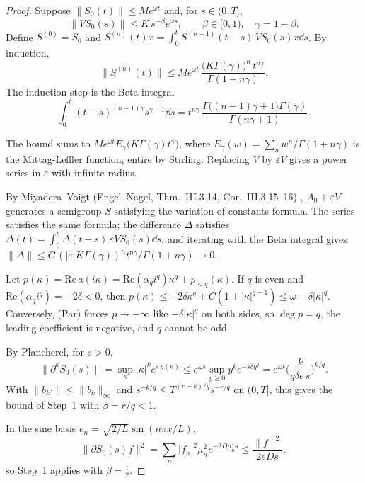 \begin{proof}
Suppose $\|S_0(t)\|\le Me^{\omega t}$ and, for $s\in(0,T]$,
\[
\|VS_0(s)\|\le K\,s^{-\beta}e^{\omega s},\qquad \beta\in[0,1),\quad \gamma=1-\beta .
\]
Define $S^{(0)}=S_0$ and $S^{(n)}(t)x=\int_0^tS^{(n-1)}(t-s)\,VS_0(s)x\dd s$. By induction,
\[
\|S^{(n)}(t)\|\le Me^{\omega t}\,\frac{\big(K\Gamma(\gamma)\big)^n\,t^{n\gamma}}{\Gamma(1+n\gamma)} .
\]
The induction step is the Beta integral
\[
\int_0^t(t-s)^{(n-1)\gamma}s^{\gamma-1}\dd s=t^{n\gamma}\,\frac{\Gamma\big((n-1)\gamma+1\big)\Gamma(\gamma)}{\Gamma(n\gamma+1)} .
\]

The bound sums to $Me^{\omega t}E_\gamma\big(K\Gamma(\gamma)t^\gamma\big)$, where $E_\gamma(w)=\sum_nw^n/\Gamma(1+n\gamma)$ is the Mittag-Leffler function, entire by Stirling. Replacing $V$ by $\varepsilon V$ gives a power series in $\varepsilon$ with infinite radius.

By Miyadera--Voigt (Engel--Nagel, Thm.~III.3.14, Cor.~III.3.15--16) \cf, $A_0+\varepsilon V$ generates a semigroup $S$ satisfying the variation-of-constants formula. The series satisfies the same formula; the difference $\Delta$ satisfies $\Delta(t)=\int_0^t\Delta(t-s)\,\varepsilon VS_0(s)\dd s$, and iterating with the Beta integral gives $\|\Delta\|\le C\,(|\varepsilon|K\Gamma(\gamma))^nt^{n\gamma}/\Gamma(1+n\gamma)\to0$.

Let $p(\kappa)=\mathrm{Re}\,a(i\kappa)=\mathrm{Re}(\alpha_qi^q)\kappa^q+p_{<q}(\kappa)$. If $q$ is even and $\mathrm{Re}(\alpha_qi^q)=-2\delta<0$, then $p(\kappa)\le-2\delta\kappa^q+C(1+|\kappa|^{q-1})\le\omega-\delta|\kappa|^q$. Conversely, (Par) forces $p\to-\infty$ like $-\delta|\kappa|^q$ on both sides, so $\deg p=q$, the leading coefficient is negative, and $q$ cannot be odd.

By Plancherel, for $s>0$,
\[
\|\partial^kS_0(s)\|=\sup_\kappa|\kappa|^ke^{s\,p(\kappa)}\le e^{\omega s}\sup_{y\ge0}y^ke^{-s\delta y^q}=e^{\omega s}\Big(\frac{k}{q\delta e\,s}\Big)^{k/q}.
\]
With $\|b_k\cdot\|\le\|b_k\|_\infty$ and $s^{-k/q}\le T^{(r-k)/q}s^{-r/q}$ on $(0,T]$, this gives the bound of Step~1 with $\beta=r/q<1$.

In the sine basis $e_n=\sqrt{2/L}\sin(n\pi x/L)$,
\[
\|\partial S_0(s)f\|^2=\sum_n|f_n|^2\mu_n^2e^{-2D\mu_n^2s}\le\frac{\|f\|^2}{2eDs},
\]
so Step~1 applies with $\beta=\tfrac12$.

\end{proof}

